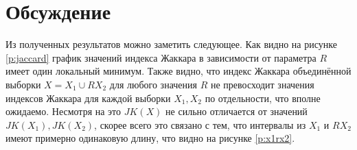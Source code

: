 \documentclass[a4paper,12pt]{article}
\begin{document}
    \section{Обсуждение}
    \quad Из полученных результатов можно заметить следующее.
    Как видно на рисунке \ref{p:jaccard} график значений индекса Жаккара
    в зависимости от параметра $ R $ имеет один локальный минимум.
    Также видно, что индекс Жаккара объединённой выборки $ X = X_1 \cup R X_2 $ для любого значения $ R $
    не превосходит значения индексов Жаккара для каждой выборки $ X_1, X_2 $ по отдельности, что вполне ожидаемо.
    Несмотря на это $ JK(X) $ не сильно отличается от значений $ JK(X_1), JK(X_2) $,
    скорее всего это связано с тем, что интервалы из $ X_1 $ и $ R X_2 $ имеют примерно одинаковую длину,
    что видно на рисунке \ref{p:x1rx2}.
\end{document}
